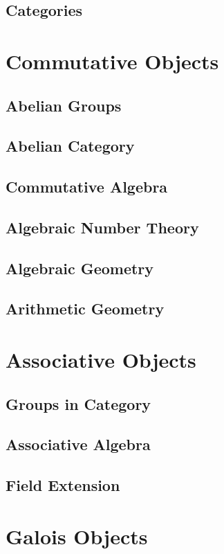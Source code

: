 \chapter{Categories}


\part{Commutative Objects}
\chapter{Abelian Groups}
\chapter{Abelian Category}
\chapter{Commutative Algebra}
\chapter{Algebraic Number Theory}
\chapter{Algebraic Geometry}
\chapter{Arithmetic Geometry}

\part{Associative Objects}
\chapter{Groups in Category}

\chapter{Associative Algebra}

\chapter{Field Extension}


\part{Galois Objects}
